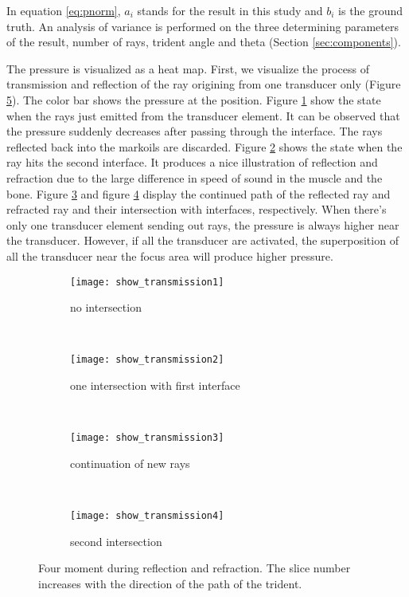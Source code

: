 In equation \ref{eq:pnorm}, $a_i$ stands for the result in this study and $b_i$ is the ground truth. An analysis of variance is performed on the three determining parameters of the result, number of rays, trident angle and theta (Section \ref{sec:components}).

The pressure is visualized as a heat map. First, we visualize the process of transmission and reflection of the ray origining from one transducer only (Figure \ref{fig:4reflection}). The color bar shows the pressure at the position. Figure \ref{fig:4reflection-a} show the state when the rays just emitted from the transducer element. It can be observed that the pressure suddenly decreases after passing through the interface. The rays reflected back into the markoils are discarded. Figure \ref{fig:4reflection-b} shows the state when the ray hits the second interface. It produces a nice illustration of reflection and refraction due to the large difference in speed of sound in the muscle and the bone. Figure \ref{fig:4reflection-c} and figure \ref{fig:4reflection-d} display the continued path of the reflected ray and refracted ray and their intersection with interfaces, respectively. When there's only one transducer element sending out rays, the pressure is always higher near the transducer. However, if all the transducer are activated, the superposition of all the transducer near the focus area will produce higher pressure.

\begin{figure}[h]
    \centering
    \begin{subfigure}[b]{0.45\textwidth}
        \texttt{[image: show\_transmission1]}
        \caption{no intersection}
        \label{fig:4reflection-a}
    \end{subfigure}
    ~ %
    \begin{subfigure}[b]{0.45\textwidth}
        \texttt{[image: show\_transmission2]}
        \caption{one intersection with first interface}
        \label{fig:4reflection-b}
    \end{subfigure}
    ~ %
    \begin{subfigure}[b]{0.45\textwidth}
        \texttt{[image: show\_transmission3]}
        \caption{continuation of new rays}
        \label{fig:4reflection-c}
    \end{subfigure}
    ~ %
    \begin{subfigure}[b]{0.45\textwidth}
        \texttt{[image: show\_transmission4]}
        \caption{second intersection}
        \label{fig:4reflection-d}
    \end{subfigure}
    \caption{Four moment during reflection and refraction. The slice number increases with the direction of the path of the trident.} \label{fig:4reflection}
\end{figure}

